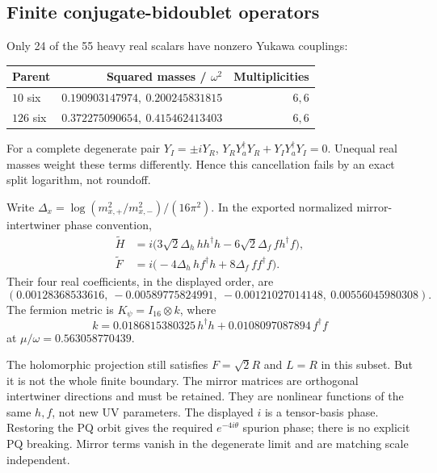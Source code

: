 \documentclass[11pt]{article}
\begin{document}
\subsection{Finite conjugate-bidoublet operators}
Only 24 of the 55 heavy real scalars have nonzero Yukawa couplings:
\begin{center}
\begin{tabular}{lrr}
\toprule
Parent & Squared masses / $\omega^2$ & Multiplicities\\
\midrule
$10$ six & $0.190903147974,\ 0.200245831815$ & $6,6$\\
$126$ six & $0.372275090654,\ 0.415462413403$ & $6,6$\\
\bottomrule
\end{tabular}
\end{center}
For a complete degenerate pair $Y_I=\pm iY_R$,
$Y_RY_a^\dagger Y_R+Y_IY_a^\dagger Y_I=0$.
Unequal real masses weight these terms differently. Hence this
cancellation fails by an exact split logarithm, not roundoff.

Write $\Delta_x=\log(m_{x,+}^2/m_{x,-}^2)/(16\pi^2)$.
In the exported normalized mirror-intertwiner phase convention,
\begin{align}
 \widetilde H&=i\bigl(3\sqrt2\Delta_h\,hh^\dagger h
 -6\sqrt2\Delta_f\,fh^\dagger f\bigr),\\
 \widetilde F&=i\bigl(-4\Delta_h\,hf^\dagger h
 +8\Delta_f\,ff^\dagger f\bigr). \label{eq:mirror}
\end{align}
Their four real coefficients, in the displayed order, are
\begin{equation}
 (0.00128368533616,\ -0.00589775824991,\
 -0.00121027014148,\ 0.00556045980308).
\end{equation}
The fermion metric is $K_\psi=I_{16}\otimes k$, where
\begin{equation}
 k=0.0186815380325\,h^\dagger h+0.0108097087894\,f^\dagger f
\end{equation}
at $\mu/\omega=0.563058770439$.

The holomorphic projection still satisfies $F=\sqrt2R$ and $L=R$ in
this subset. But it is not the whole finite boundary. The mirror
matrices are orthogonal intertwiner directions and must be retained.
They are nonlinear functions of the same $h,f$, not new UV parameters.
The displayed $i$ is a tensor-basis phase. Restoring the PQ orbit gives
the required $e^{-4i\theta}$ spurion phase; there is no explicit PQ
breaking. Mirror terms vanish in the degenerate limit and are matching
scale independent.
\end{document}
